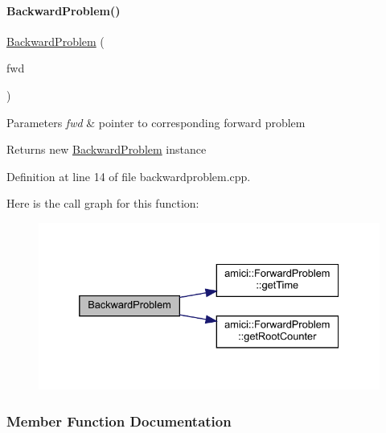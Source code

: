 \paragraph{\texorpdfstring{BackwardProblem()}{BackwardProblem()}}
{\footnotesize\ttfamily \mbox{\hyperlink{classamici_1_1_backward_problem}{Backward\+Problem}} (\begin{DoxyParamCaption}\item[{const \mbox{\hyperlink{classamici_1_1_forward_problem}{Forward\+Problem}} $\ast$}]{fwd }\end{DoxyParamCaption})\hspace{0.3cm}{\ttfamily [explicit]}}


\begin{DoxyParams}{Parameters}
{\em fwd} & pointer to corresponding forward problem \\
\hline
\end{DoxyParams}
\begin{DoxyReturn}{Returns}
new \mbox{\hyperlink{classamici_1_1_backward_problem}{Backward\+Problem}} instance 
\end{DoxyReturn}


Definition at line 14 of file backwardproblem.\+cpp.

Here is the call graph for this function\+:
\nopagebreak
\begin{figure}[H]
\begin{center}
\leavevmode
\includegraphics[width=332pt]{classamici_1_1_backward_problem_a173995c3ce3a4c59d815dfbeebb8dc6e_cgraph}
\end{center}
\end{figure}


\subsubsection{Member Function Documentation}
\mbox{\label{classamici_1_1_backward_problem_a4a17093ee76348cce97b06c94bf518bd}} 
